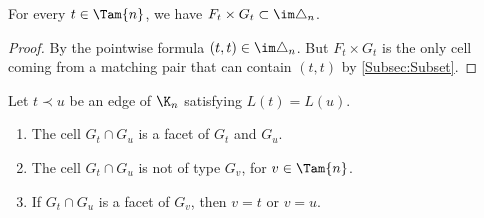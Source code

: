 \begin{proposition}\label{prop:FtGt}
For every $t\in \Tam{n}$, we have $F_t\times G_t\subset \im \triangle_n$.
\end{proposition}

\begin{proof}
By the pointwise formula $(t, t)\in \im\triangle_n$. But $F_t\times G_t$ is the only cell coming from a matching pair that can contain $(t, t)$ by \cref{Subsec:Subset}.
\end{proof}

\begin{lemma}\label{lem:FacetGuGt}
Let $t\prec u$ be an edge of $\K_n$ satisfying $L(t) = L(u)$.
\begin{enumerate}
\item\label{lem:FacetGuGt1} The cell $G_t\cap G_u$ is a facet of $G_t$ and $G_u$.

\item\label{lem:FacetGuGt2} The cell $G_t\cap G_u$ is not of type $G_v$, for $v\in \Tam{n}$.

\item\label{lem:FacetGuGt3} If $G_t\cap G_u$ is a facet of $G_v$, then $v=t$ or $v=u$.
\end{enumerate}
\end{lemma}

